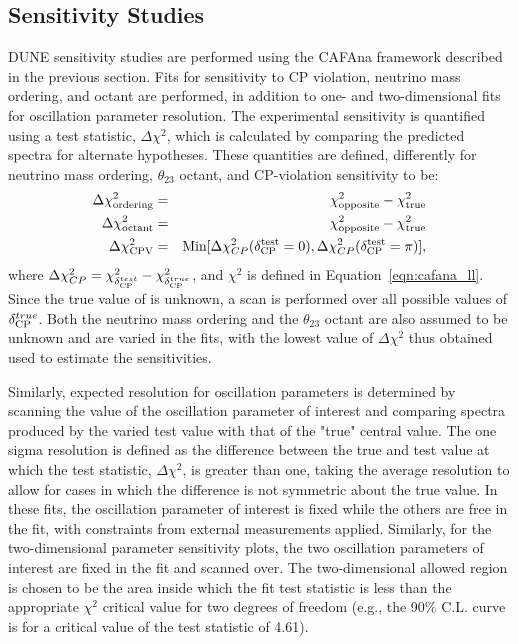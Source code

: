 \subsection{Sensitivity Studies}
\label{sect:methods-dunefits}
DUNE sensitivity studies are performed using the CAFAna framework described in the previous section. Fits for sensitivity to CP violation, neutrino mass ordering, and octant are performed, in addition to one- and two-dimensional fits for oscillation parameter resolution.
The experimental sensitivity is quantified using a test statistic, $\Delta\chi^2$, which is calculated by comparing the predicted spectra for alternate hypotheses. These quantities are defined, differently for neutrino mass ordering, $\theta_{23}$ octant, and CP-violation sensitivity to be:
\begin{eqnarray}
\Delta\chi^2_{\textrm{ordering}} & = & \chi^2_{\textrm{opposite}} - \chi^2_{\textrm{true}} \label{eq:dx2_MH}\\
\Delta\chi^2_{\textrm{octant}} & = & \chi^2_{\textrm{opposite}} - \chi^2_{\textrm{true}} \\
\Delta\chi^2_{\textrm{CPV}} & = & \textrm{Min}[\Delta\chi^2_{CP}(\delta_{\rm CP}^{\textrm{test}}=0),\Delta\chi^2_{CP}(\delta_{\rm CP}^{\textrm{test}}=\pi)],
\end{eqnarray}
where $\Delta\chi^2_{CP} = \chi^{2}_{\delta_{\rm CP}^{test}} - \chi^2_{\delta_{\rm CP}^{true}}$, and $\chi^2$ is defined in Equation~\ref{eqn:cafana_ll}. Since the true value of \deltacp is unknown, a scan is performed over all possible values of $\delta_{\rm CP}^{true}$. Both the neutrino mass ordering and the $\theta_{23}$ octant are also assumed to be unknown and are varied in the fits, with the lowest value of $\Delta\chi^2$ thus obtained used to estimate the sensitivities. 

Similarly, expected resolution for oscillation parameters is determined by scanning the value of the oscillation parameter of interest and comparing spectra produced by the varied test value with that of the "true" central value. The one sigma resolution is defined as the difference between the true and test value at which the test statistic, $\Delta\chi^2$, is greater than one, taking the average resolution to allow for cases in which the difference is not symmetric about the true value. In these fits, the oscillation parameter of interest is fixed while the others are free in the fit, with constraints from external measurements applied. Similarly, for the two-dimensional parameter sensitivity plots, the two oscillation parameters of interest are fixed in the fit and scanned over. The two-dimensional allowed region is chosen to be the area inside which the fit test statistic is less than the appropriate $\chi^2$ critical value for two degrees of freedom (e.g., the 90\% C.L. curve is for a critical value of the test statistic of 4.61).

